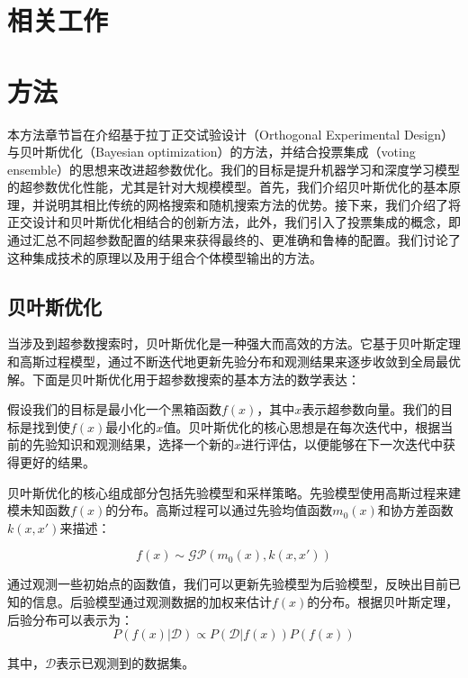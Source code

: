 \documentclass{SCIA2018cn}
\theoremstyle{mystyle}
\begin{document}
\section{相关工作}


\section{方法}

本方法章节旨在介绍基于拉丁正交试验设计（Orthogonal Experimental Design）与贝叶斯优化（Bayesian optimization）的方法，并结合投票集成（voting ensemble）的思想来改进超参数优化。我们的目标是提升机器学习和深度学习模型的超参数优化性能，尤其是针对大规模模型。首先，我们介绍贝叶斯优化的基本原理，并说明其相比传统的网格搜索和随机搜索方法的优势。接下来，我们介绍了将正交设计和贝叶斯优化相结合的创新方法，此外，我们引入了投票集成的概念，即通过汇总不同超参数配置的结果来获得最终的、更准确和鲁棒的配置。我们讨论了这种集成技术的原理以及用于组合个体模型输出的方法。

\subsection{贝叶斯优化}

当涉及到超参数搜索时，贝叶斯优化是一种强大而高效的方法。它基于贝叶斯定理和高斯过程模型，通过不断迭代地更新先验分布和观测结果来逐步收敛到全局最优解。下面是贝叶斯优化用于超参数搜索的基本方法的数学表达：

假设我们的目标是最小化一个黑箱函数$f(x)$，其中$x$表示超参数向量。我们的目标是找到使$f(x)$最小化的$x$值。贝叶斯优化的核心思想是在每次迭代中，根据当前的先验知识和观测结果，选择一个新的$x$进行评估，以便能够在下一次迭代中获得更好的结果。

贝叶斯优化的核心组成部分包括先验模型和采样策略。先验模型使用高斯过程来建模未知函数$f(x)$的分布。高斯过程可以通过先验均值函数$m_0(x)$和协方差函数$k(x,x')$来描述：

\begin{equation}
f(x)\sim\mathcal{GP}(m_0(x),k(x,x'))
\end{equation}


通过观测一些初始点的函数值，我们可以更新先验模型为后验模型，反映出目前已知的信息。后验模型通过观测数据的加权来估计$f(x)$的分布。根据贝叶斯定理，后验分布可以表示为：
\begin{equation}
P(f(x)|\mathcal{D})\propto P(\mathcal{D}|f(x))P(f(x))
\end{equation}

其中，$\mathcal{D}$表示已观测到的数据集。
\end{document}
